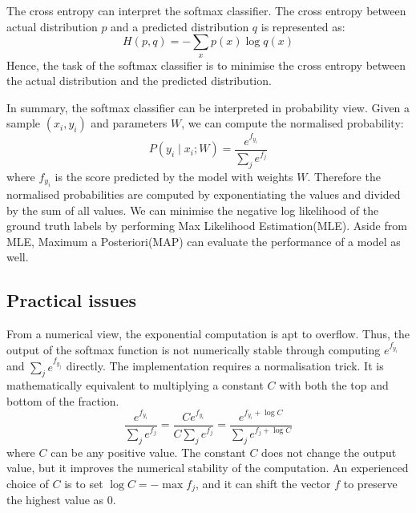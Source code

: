 The cross entropy can interpret the softmax classifier. The cross entropy between actual distribution $p$ and a predicted distribution $q$ is represented as:
\begin{equation}\label{eq:CrossEntropyDiff}
H(p,q) = - \sum_x p(x) \log q(x)
\end{equation}
Hence, the task of the softmax classifier is to minimise the cross entropy between the actual distribution and the predicted distribution. 

In summary, the softmax classifier can be interpreted in probability view. Given a sample $(x_i, y_i)$ and parameters $W$, we can compute the normalised probability:
\begin{equation}\label{eq:ProbInter}
P(y_i \mid x_i; W) = \frac{e^{f_{y_i}}}{\sum_j e^{f_j} }
\end{equation}
where $f_{y_i}$ is the score predicted by the model with weights $W$. Therefore the normalised probabilities are computed by exponentiating the values and divided by the sum of all values. We can minimise the negative log likelihood of the ground truth labels by performing Max Likelihood Estimation(MLE). Aside from MLE, Maximum a Posteriori(MAP) can evaluate the performance of a model as well.

\subsection{Practical issues}

From a numerical view, the exponential computation is apt to overflow. Thus, the output of the softmax function is not numerically stable through computing $e^{f_{y_i}}$ and $\sum_j e^{f_{y_j}}$ directly. The implementation requires a normalisation trick. It is mathematically equivalent to multiplying a constant $C$ with both the top and bottom of the fraction.
\begin{equation}\label{eq:SoftmaxTricks}
\frac{e^{f_{y_i}}}{\sum_j e^{f_j}}
= \frac{Ce^{f_{y_i}}}{C\sum_j e^{f_j}}
= \frac{e^{f_{y_i} + \log C}}{\sum_j e^{f_j + \log C}}
\end{equation}
where $C$ can be any positive value. The constant $C$ does not change the output value, but it improves the numerical stability of the computation. An experienced choice of $C$ is to set $\log C = -\max f_j$, and it can shift the vector $f$ to preserve the highest value as $0$.

